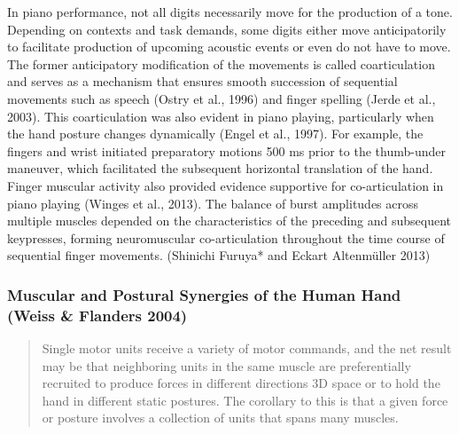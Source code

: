 {            In piano performance, not all digits necessarily move for
            the production of a tone. Depending on contexts and task
            demands, some digits either move anticipatorily to
            facilitate production of upcoming acoustic events or even do
            not have to move. The former anticipatory modification of
            the movements is called coarticulation and serves as a
            mechanism that ensures smooth succession of sequential
            movements such as speech (Ostry et al., 1996) and finger
            spelling (Jerde et al., 2003). This coarticulation was also
            evident in piano playing, particularly when the hand posture
            changes dynamically (Engel et al., 1997). For example, the
            fingers and wrist initiated preparatory motions 500 ms prior
            to the thumb-under maneuver, which facilitated the
            subsequent horizontal translation of the hand. Finger
            muscular activity also provided evidence supportive for
            co-articulation in piano playing (Winges et al., 2013). The
            balance of burst amplitudes across multiple muscles depended
            on the characteristics of the preceding and subsequent
            keypresses, forming neuromuscular co-articulation throughout
            the time course of sequential finger movements. (Shinichi
            Furuya* and Eckart Altenmüller 2013)

            \hypertarget{muscular-and-postural-synergies-of-the-human-hand-weiss-flanders-2004}{%
            \subsubsection{Muscular and Postural Synergies of the Human
            Hand (Weiss \& Flanders
            2004)}\label{muscular-and-postural-synergies-of-the-human-hand-weiss-flanders-2004}}

            \begin{quote}
            Single motor units receive a variety of motor commands, and
            the net result may be that neighboring units in the same
            muscle are preferentially recruited to produce forces in
            different directions 3D space or to hold the hand in
            different static postures. The corollary to this is that a
            given force or posture involves a collection of units that
            spans many muscles.
            \end{quote}

}
